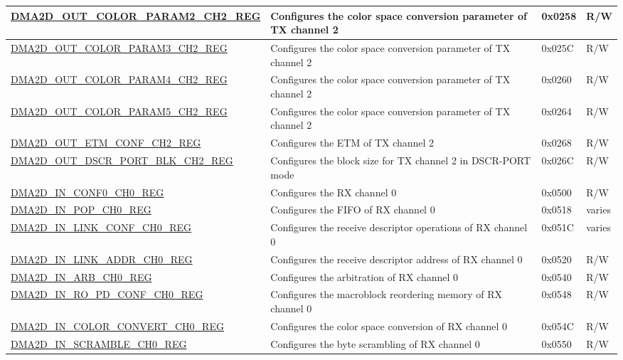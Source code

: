 \begin{longtable}{ | p{7cm} | p{11.5cm} | p{1.3cm} | p{2cm} | }
\hyperref[regdesc:DMA2DOUTCOLORPARAM2CHNREG]{DMA2D\_OUT\_COLOR\_PARAM2\_CH2\_REG} & Configures the color space conversion parameter of TX channel 2 & 0x0258 & R/W \\ \hline
\hyperref[regdesc:DMA2DOUTCOLORPARAM3CHNREG]{DMA2D\_OUT\_COLOR\_PARAM3\_CH2\_REG} & Configures the color space conversion parameter of TX channel 2 & 0x025C & R/W \\ \hline
\hyperref[regdesc:DMA2DOUTCOLORPARAM4CHNREG]{DMA2D\_OUT\_COLOR\_PARAM4\_CH2\_REG} & Configures the color space conversion parameter of TX channel 2 & 0x0260 & R/W \\ \hline
\hyperref[regdesc:DMA2DOUTCOLORPARAM5CHNREG]{DMA2D\_OUT\_COLOR\_PARAM5\_CH2\_REG} & Configures the color space conversion parameter of TX channel 2 & 0x0264 & R/W \\ \hline
\hyperref[regdesc:DMA2DOUTETMCONFCHNREG]{DMA2D\_OUT\_ETM\_CONF\_CH2\_REG} & Configures the ETM of TX channel 2 & 0x0268 & R/W \\ \hline
\hyperref[regdesc:DMA2DOUTDSCRPORTBLKCHNREG]{DMA2D\_OUT\_DSCR\_PORT\_BLK\_CH2\_REG} & Configures the block size for TX channel 2 in DSCR-PORT mode & 0x026C & R/W \\ \hline
\hyperref[regdesc:DMA2DINCONF0CHNREG]{DMA2D\_IN\_CONF0\_CH0\_REG} & Configures the RX channel 0 & 0x0500 & R/W \\ \hline
\hyperref[regdesc:DMA2DINPOPCHNREG]{DMA2D\_IN\_POP\_CH0\_REG} & Configures the FIFO of RX channel 0 & 0x0518 & varies \\ \hline
\hyperref[regdesc:DMA2DINLINKCONFCHNREG]{DMA2D\_IN\_LINK\_CONF\_CH0\_REG} & Configures the receive descriptor operations of RX channel 0 & 0x051C & varies \\ \hline
\hyperref[regdesc:DMA2DINLINKADDRCHNREG]{DMA2D\_IN\_LINK\_ADDR\_CH0\_REG} & Configures the receive descriptor address of RX channel 0 & 0x0520 & R/W \\ \hline
\hyperref[regdesc:DMA2DINARBCHNREG]{DMA2D\_IN\_ARB\_CH0\_REG} & Configures the arbitration of RX channel 0 & 0x0540 & R/W \\ \hline
\hyperref[regdesc:DMA2DINROPDCONFCH0REG]{DMA2D\_IN\_RO\_PD\_CONF\_CH0\_REG} & Configures the macroblock reordering memory of RX channel 0 & 0x0548 & R/W \\ \hline
\hyperref[regdesc:DMA2DINCOLORCONVERTCH0REG]{DMA2D\_IN\_COLOR\_CONVERT\_CH0\_REG} & Configures the color space conversion of RX channel 0 & 0x054C & R/W \\ \hline
\hyperref[regdesc:DMA2DINSCRAMBLECH0REG]{DMA2D\_IN\_SCRAMBLE\_CH0\_REG} & Configures the byte scrambling of RX channel 0 & 0x0550 & R/W \\ \hline

\end{longtable}
